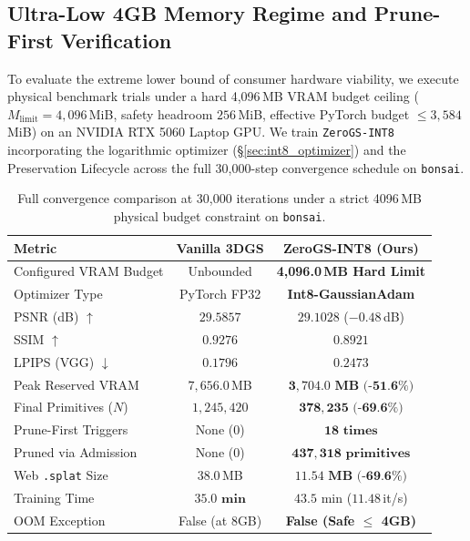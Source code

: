 \documentclass[10pt,twocolumn,letterpaper]{article}
\begin{document}
\subsection{Ultra-Low 4GB Memory Regime and Prune-First Verification}
\label{sec:4gb_regime}

To evaluate the extreme lower bound of consumer hardware viability, we execute physical benchmark trials under a hard 4,096\,MB VRAM budget ceiling ($M_{\text{limit}} = 4{,}096$\,MiB, safety headroom $256$\,MiB, effective PyTorch budget $\le 3{,}584$\,MiB) on an NVIDIA RTX 5060 Laptop GPU. We train \texttt{ZeroGS-INT8} incorporating the logarithmic optimizer (\S\ref{sec:int8_optimizer}) and the Preservation Lifecycle across the full 30,000-step convergence schedule on \texttt{bonsai}.

\begin{table}[t]
\centering
\small
\caption{Full convergence comparison at 30,000 iterations under a strict 4096\,MB physical budget constraint on \texttt{bonsai}.}
\label{tab:4gb_benchmark}
\begin{tabular}{lcc}
\toprule
\textbf{Metric} & \textbf{Vanilla 3DGS} & \textbf{ZeroGS-INT8 (Ours)} \\
\midrule
Configured VRAM Budget & Unbounded & \textbf{4,096.0\,MB Hard Limit} \\
Optimizer Type & PyTorch FP32 & \textbf{Int8-GaussianAdam} \\
PSNR (dB) $\uparrow$ & $\mathbf{29.5857}$ & $29.1028$ ($-0.48$\,dB) \\
SSIM $\uparrow$ & $\mathbf{0.9276}$ & $0.8921$ \\
LPIPS (VGG) $\downarrow$ & $\mathbf{0.1796}$ & $0.2473$ \\
Peak Reserved VRAM & $7{,}656.0$\,MB & $\mathbf{3{,}704.0\text{ MB (-51.6\%)}}$ \\
Final Primitives ($N$) & $1{,}245{,}420$ & $\mathbf{378{,}235\text{ (-69.6\%)}}$ \\
Prune-First Triggers & None ($0$) & $\mathbf{18\text{ times}}$ \\
Pruned via Admission & None ($0$) & $\mathbf{437{,}318\text{ primitives}}$ \\
Web \texttt{.splat} Size & $38.0$\,MB & $\mathbf{11.54\text{ MB (-69.6\%)}}$ \\
Training Time & $\mathbf{35.0\text{ min}}$ & $43.5\text{ min}$ ($11.48$\,it/s) \\
OOM Exception & False (at 8GB) & \textbf{False (Safe $\le$ 4GB)} \\
\bottomrule
\end{tabular}
\end{table}
\end{document}
